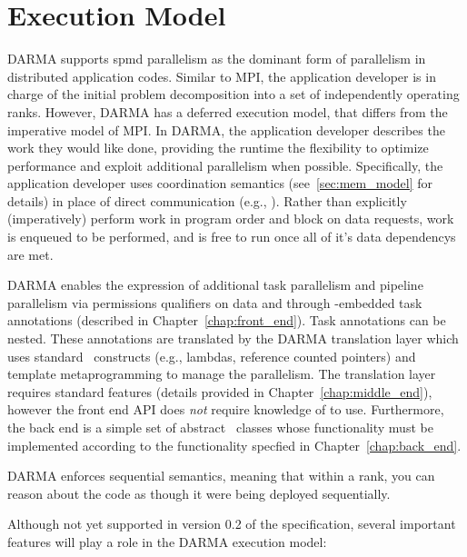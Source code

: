 \section{Execution Model}
\label{sec:exec_model}
DARMA supports \gls{spmd} parallelism as the dominant form of parallelism in
distributed application codes. Similar to \gls{MPI}, the application developer
is in charge of the initial problem decomposition into a set of
independently operating \glspl{rank}. 
However, DARMA has a \gls{deferred} \gls{execution model}, that differs from the
\gls{imperative} model of \gls{MPI}.
In DARMA, the application developer describes the
work they would like done, providing the runtime the flexibility to optimize performance and
exploit additional parallelism when possible.    
Specifically, the application developer uses \gls{coordination semantics}
(see~\ref{sec:mem_model} for details) in place of direct communication (e.g.,
    ).  Rather than explicitly (imperatively)
perform work in program order and block on data requests, work is enqueued to
be performed, and is free to run once all of it's data \glspl{dependency} are met.


DARMA enables the expression of additional \gls{task parallelism} and
\gls{pipeline parallelism} via permissions qualifiers on data 
and through \CC-embedded task annotations (described in
    Chapter~\ref{chap:front_end}). Task annotations can be nested.
These annotations are translated by
the DARMA \gls{translation layer} which uses standard \CC\ constructs (e.g., lambdas,
  reference counted pointers) and \gls{template
metaprogramming} to manage the parallelism.  The \gls{translation layer} requires
 standard features (details provided in Chapter~\ref{chap:middle_end}), 
  however the \gls{front end} \gls{API} does \emph{not}
require knowledge of  to use. Furthermore, the \gls{back end} is a
simple set of abstract \CC\ classes whose functionality must be implemented
according to the functionality specfied in Chapter~\ref{chap:back_end}.

DARMA enforces \gls{sequential semantics}, meaning that within a \gls{rank}, you can reason about the code as
though it were being deployed sequentially.   


Although not yet supported in version 0.2 of the specification, several
important features will play a role in the DARMA execution model:

